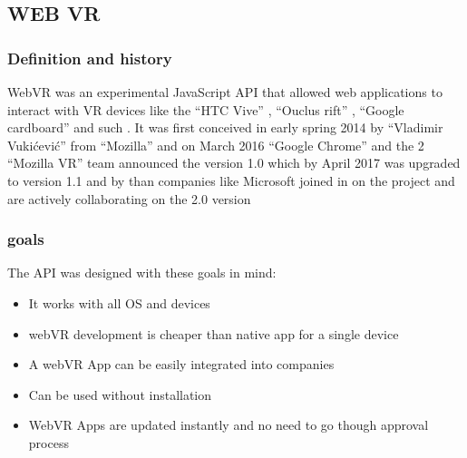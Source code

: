 \documentclass[]{report}
\begin{document}
\subsection{WEB VR}
\subsubsection{Definition and history }
WebVR was an experimental JavaScript API that allowed web applications to
	interact with VR devices like the “HTC Vive” , “Ouclus rift” , “Google
	cardboard” and such . It was first conceived in early spring 2014 by “Vladimir
	Vukićević” from “Mozilla” and on March 2016 “Google Chrome” and the
	2
	“Mozilla VR” team announced the version 1.0 which by April 2017 was
	upgraded to version 1.1 and by than companies like Microsoft joined in on the
	project and are actively collaborating on the 2.0 version \cite{lambo}

\subsubsection{goals}

The API was designed with these goals in mind:
\begin{itemize}
	
		\item It works with all OS and devices
		\item webVR development is cheaper
		than native app for a single device
		\item A webVR App can be easily
		integrated into companies
		\item Can be used without installation
		\item WebVR Apps are updated instantly
		and no need to go though approval
		process
\end{itemize}
\end{document}

